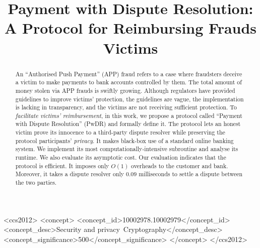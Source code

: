 \documentclass[sigconf,anonymous]{acmart}
\theoremstyle{remark}
\begin{document}
\newtheorem{claim}{Claim}[theorem]
\title{Payment with Dispute Resolution: \\ A Protocol for Reimbursing Frauds Victims}

\begin{abstract}
An ``Authorised Push Payment'' (APP) fraud refers to a case where fraudsters deceive a victim to make payments to bank accounts controlled by them.  The total amount of money stolen via APP frauds is swiftly growing. Although regulators have provided guidelines to improve victims’ protection, the guidelines are vague, the implementation is lacking in transparency, and the victims are not receiving sufficient protection. To  \emph{facilitate victims' reimbursement}, in this work, we propose a protocol called  ``Payment with Dispute Resolution'' (PwDR) and formally define it. The protocol lets an honest victim prove its innocence to a third-party dispute resolver while preserving the protocol participants' \emph{privacy}. It makes black-box use of a standard online banking system. We implement its most computationally-intensive subroutine and analyse its runtime. We also evaluate its asymptotic cost. Our evaluation indicates that the protocol is efficient. It imposes only $O(1)$ overheads to the customer and bank.  Moreover, it takes a dispute resolver only $0.09$ milliseconds to settle a dispute between the two parties.
\end{abstract}

\begin{CCSXML}
<ccs2012>
<concept>
<concept_id>10002978.10002979</concept_id>
<concept_desc>Security and privacy~Cryptography</concept_desc>
<concept_significance>500</concept_significance>
</concept>
</ccs2012>
\end{CCSXML}




\newenvironment{packed_item}{
\begin{itemize}
	\setlength{\topsep}{0pt}
	\setlength{\partopsep}{0pt}
  \setlength{\itemsep}{0pt}
  \setlength{\parskip}{0pt}
  \setlength{\parsep}{0pt}
}{\end{itemize}}
\end{document}
